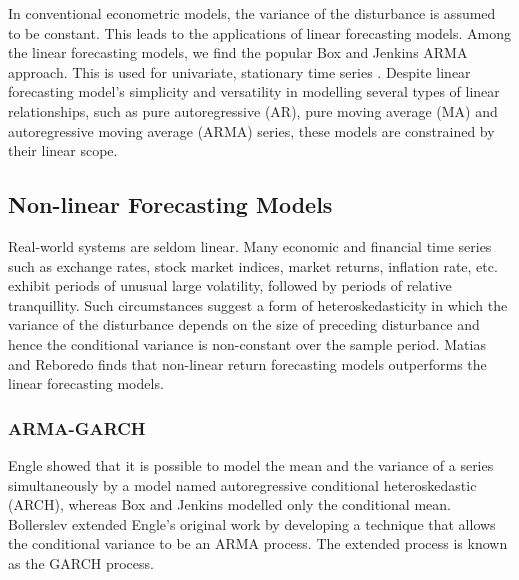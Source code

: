 In conventional econometric models, the variance of the disturbance is assumed to be constant. This leads to the applications of linear forecasting models. Among the linear forecasting models, we find the popular Box and Jenkins ARMA approach. This is used for univariate, stationary time series \cite{B&J}. Despite linear forecasting model's simplicity and versatility in modelling several types of linear relationships, such as pure autoregressive (AR), pure moving average (MA) and autoregressive moving average (ARMA) series, these models are constrained by their linear scope.

\subsection{Non-linear Forecasting Models}
Real-world systems are seldom linear. Many economic and financial time series such as exchange rates, stock market indices, market returns, inflation rate, etc. exhibit periods of unusual large volatility, followed by periods of relative tranquillity. Such circumstances suggest a form of heteroskedasticity in which the variance of the disturbance depends on the size of preceding disturbance and hence the conditional variance is non-constant over the sample period. Matias and Reboredo \cite{M&R} finds that non-linear return forecasting models outperforms the linear forecasting models.

\subsubsection{ARMA-GARCH}
Engle \cite{Engel} showed that it is possible to model the mean and the variance of a series simultaneously by a model named autoregressive conditional heteroskedastic (ARCH), whereas Box and Jenkins \cite{B&J} modelled only the conditional mean. Bollerslev \cite{Bollerslev} extended Engle’s \cite{Engel} original work by developing a technique that allows the conditional variance to be an ARMA process. The extended process is known as the GARCH process. 

